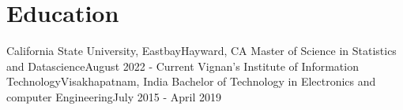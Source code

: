 
\section{Education}
  \resumeSubHeadingListStart
    \resumeSubheading
      {California State University, Eastbay}{Hayward, CA}
      {Master of Science in Statistics and Datascience}{August 2022 - Current}
    \resumeSubHeadingListEnd
    \resumeSubHeadingListStart
    \resumeSubheading
      {Vignan's Institute of Information Technology}{Visakhapatnam, India}
      {Bachelor of Technology in Electronics and computer Engineering}{July 2015 - April 2019}
    \resumeSubHeadingListEnd
